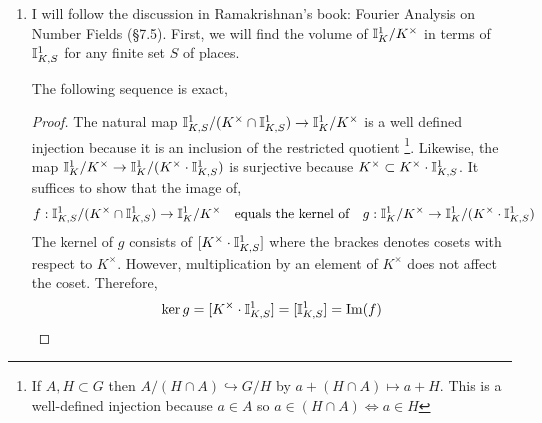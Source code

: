 \documentclass[12pt]{extarticle}
\begin{document}
\begin{enumerate}
\item I will follow the discussion in Ramakrishnan's book: Fourier Analysis on Number Fields (\S 7.5). First, we will find the volume of $\mathbb{I}^1_{K}/K^\times$ in terms of $\mathbb{I}^1_{K, S}$ for any finite set $S$ of places. 

\begin{lemma}
The following sequence is exact,
\begin{center}
\end{center}
\end{lemma}

\begin{proof}
The natural map $\mathbb{I}^1_{K, S} / (K^\times \cap \mathbb{I}^1_{K, S}) \to \mathbb{I}^1_{K} / K^\times$ is a well defined injection because it is an inclusion of the restricted quotient \footnote{If $A, H \subset G$ then $A/(H \cap A) \hookrightarrow G/H$ by $a + (H \cap A) \mapsto a + H$. This is a well-defined injection because $a \in A$ so $a \in (H \cap A) \iff a \in H$ }. Likewise, the map $\mathbb{I}^1_{K} / K^\times \to \mathbb{I}^1_{K} / (K^\times \cdot \mathbb{I}^1_{K, S})$ is surjective because $K^\times \subset K^\times \cdot \mathbb{I}^1_{K, S}$. It suffices to show that the image of,
\[f : \mathbb{I}^1_{K, S} / (K^\times \cap \mathbb{I}^1_{K, S}) \to \mathbb{I}^1_{K}/K^\times \quad \text{equals the kernel of} \quad g : \mathbb{I}^1_{K}/K^\times \to \mathbb{I}^1_{K} / (K^\times \cdot \mathbb{I}^1_{K, S})\]
The kernel of $g$ consists of $[K^\times \cdot \mathbb{I}^1_{K, S}]$ where the brackes denotes cosets with respect to $K^\times$. However, multiplication by an element of $K^\times$ does not affect the coset. Therefore, 
\[ \ker{g} = [K^\times \cdot \mathbb{I}^1_{K, S}] = [\mathbb{I}^1_{K, S}] = \mathrm{Im}(f)\]
\end{proof}


\end{enumerate}
\end{document}
